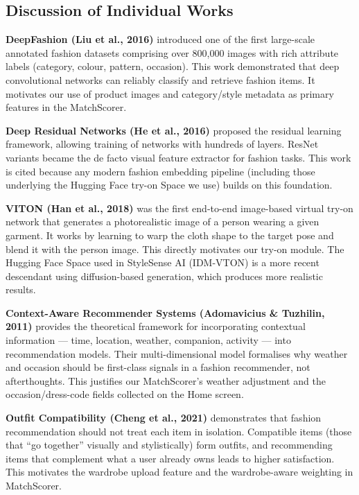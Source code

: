 \documentclass[12pt,a4paper]{report}
\newcommand{\ProjectShort}{StyleSense AI}
\begin{document}
\subsection*{Discussion of Individual Works}

\textbf{DeepFashion (Liu et al., 2016)} introduced one of the first large-scale annotated fashion datasets comprising over 800,000 images with rich attribute labels (category, colour, pattern, occasion). This work demonstrated that deep convolutional networks can reliably classify and retrieve fashion items. It motivates our use of product images and category/style metadata as primary features in the MatchScorer.

\textbf{Deep Residual Networks (He et al., 2016)} proposed the residual learning framework, allowing training of networks with hundreds of layers. ResNet variants became the de facto visual feature extractor for fashion tasks. This work is cited because any modern fashion embedding pipeline (including those underlying the Hugging Face try-on Space we use) builds on this foundation.

\textbf{VITON (Han et al., 2018)} was the first end-to-end image-based virtual try-on network that generates a photorealistic image of a person wearing a given garment. It works by learning to warp the cloth shape to the target pose and blend it with the person image. This directly motivates our try-on module. The Hugging Face Space used in \ProjectShort{} (IDM-VTON) is a more recent descendant using diffusion-based generation, which produces more realistic results.

\textbf{Context-Aware Recommender Systems (Adomavicius \& Tuzhilin, 2011)} provides the theoretical framework for incorporating contextual information --- time, location, weather, companion, activity --- into recommendation models. Their multi-dimensional model formalises why weather and occasion should be first-class signals in a fashion recommender, not afterthoughts. This justifies our MatchScorer's weather adjustment and the occasion/dress-code fields collected on the Home screen.

\textbf{Outfit Compatibility (Cheng et al., 2021)} demonstrates that fashion recommendation should not treat each item in isolation. Compatible items (those that ``go together'' visually and stylistically) form outfits, and recommending items that complement what a user already owns leads to higher satisfaction. This motivates the wardrobe upload feature and the wardrobe-aware weighting in MatchScorer.
\end{document}
